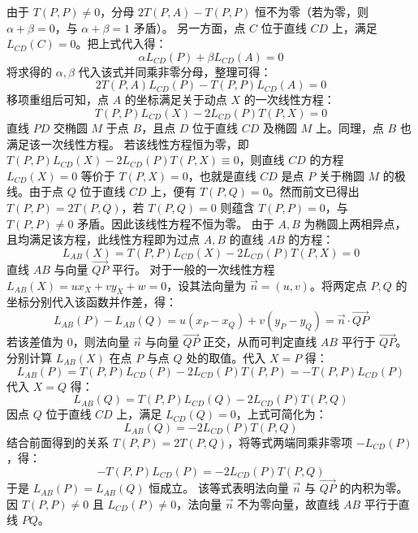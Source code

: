 \begin{solution}
由于 $T(P,P) \neq 0$，分母 $2T(P,A) - T(P,P)$ 恒不为零（若为零，则 $\alpha + \beta = 0$，与 $\alpha + \beta = 1$ 矛盾）。
另一方面，点 $C$ 位于直线 $CD$ 上，满足 $L_{CD}(C) = 0$。把上式代入得：
\[ \alpha L_{CD}(P) + \beta L_{CD}(A) = 0 \]
将求得的 $\alpha, \beta$ 代入该式并同乘非零分母，整理可得：
\[ 2T(P,A)L_{CD}(P) - T(P,P)L_{CD}(A) = 0 \]
移项重组后可知，点 $A$ 的坐标满足关于动点 $X$ 的一次线性方程：
\[ T(P,P)L_{CD}(X) - 2L_{CD}(P)T(P,X) = 0 \]
直线 $PD$ 交椭圆 $M$ 于点 $B$，且点 $D$ 位于直线 $CD$ 及椭圆 $M$ 上。同理，点 $B$ 也满足该一次线性方程。
若该线性方程恒为零，即 $T(P,P)L_{CD}(X) - 2L_{CD}(P)T(P,X) \equiv 0$，则直线 $CD$ 的方程 $L_{CD}(X) = 0$ 等价于 $T(P,X) = 0$，也就是直线 $CD$ 是点 $P$ 关于椭圆 $M$ 的极线。由于点 $Q$ 位于直线 $CD$ 上，便有 $T(P,Q) = 0$。然而前文已得出 $T(P,P) = 2T(P,Q)$，若 $T(P,Q) = 0$ 则蕴含 $T(P,P) = 0$，与 $T(P,P) \neq 0$ 矛盾。因此该线性方程不恒为零。
由于 $A, B$ 为椭圆上两相异点，且均满足该方程，此线性方程即为过点 $A, B$ 的直线 $AB$ 的方程：
\[ L_{AB}(X) = T(P,P)L_{CD}(X) - 2L_{CD}(P)T(P,X) = 0 \]
直线 $AB$ 与向量 $\overrightarrow{QP}$ 平行。
对于一般的一次线性方程 $L_{AB}(X) = u x_X + v y_X + w = 0$，设其法向量为 $\vec{n} = (u, v)$。将两定点 $P, Q$ 的坐标分别代入该函数并作差，得：
\[ L_{AB}(P) - L_{AB}(Q) = u(x_P - x_Q) + v(y_P - y_Q) = \vec{n} \cdot \overrightarrow{QP} \]
若该差值为 $0$，则法向量 $\vec{n}$ 与向量 $\overrightarrow{QP}$ 正交，从而可判定直线 $AB$ 平行于 $\overrightarrow{QP}$。
分别计算 $L_{AB}(X)$ 在点 $P$ 与点 $Q$ 处的取值。代入 $X = P$ 得：
\[ L_{AB}(P) = T(P,P)L_{CD}(P) - 2L_{CD}(P)T(P,P) = -T(P,P)L_{CD}(P) \]
代入 $X = Q$ 得：
\[ L_{AB}(Q) = T(P,P)L_{CD}(Q) - 2L_{CD}(P)T(P,Q) \]
因点 $Q$ 位于直线 $CD$ 上，满足 $L_{CD}(Q) = 0$，上式可简化为：
\[ L_{AB}(Q) = -2L_{CD}(P)T(P,Q) \]
结合前面得到的关系 $T(P,P) = 2T(P,Q)$，将等式两端同乘非零项 $-L_{CD}(P)$，得：
\[ -T(P,P)L_{CD}(P) = -2L_{CD}(P)T(P,Q) \]
于是 $L_{AB}(P) = L_{AB}(Q)$ 恒成立。
该等式表明法向量 $\vec{n}$ 与 $\overrightarrow{QP}$ 的内积为零。因 $T(P,P) \neq 0$ 且 $L_{CD}(P) \neq 0$，法向量 $\vec{n}$ 不为零向量，故直线 $AB$ 平行于直线 $PQ$。

\end{solution}

